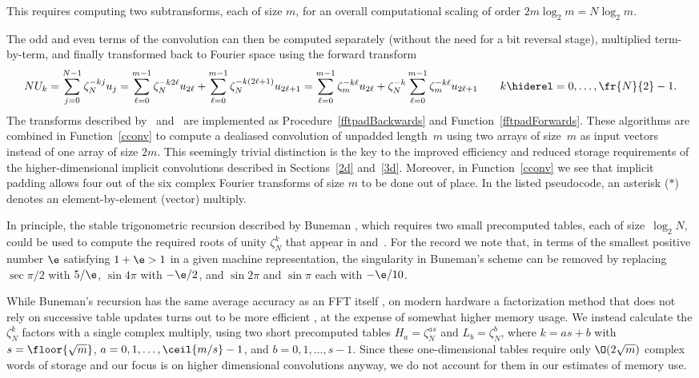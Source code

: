 \documentclass[final]{siamltex}
\def\bel{\begin{dmath}}
\def\eel{\end{dmath}}
\def\no{\hiderel}
\begin{document}
This requires computing two subtransforms, each of size $m$,
for an overall computational scaling of order $2m\log_2 m=N\log_2 m$.

The odd and even terms of the convolution can then be computed separately
(without the need for a bit reversal stage), multiplied term-by-term, and
finally transformed back to Fourier space using the forward transform
\bel
NU_k=\sum_{j=0}^{N-1}\zeta_N^{-kj} u_j
=\sum_{\ell=0}^{m-1}\zeta_N^{-k2\ell} u_{2\ell}
+\sum_{\ell=0}^{m-1}\zeta_N^{-k(2\ell+1)} u_{2\ell+1}
=\sum_{\ell=0}^{m-1}\zeta_m^{-k\ell} u_{2\ell}
+\zeta_N^{-k}\sum_{\ell=0}^{m-1}\zeta_m^{-k\ell} u_{2\ell+1}
\qquad k\no=0,\ldots,\fr{N}{2}-1.\label{cconv1forwards}
\eel
The transforms described by~ and~
are implemented as Procedure~\ref{fftpadBackwards} and
Function~\ref{fftpadForwards}.
These algorithms are combined in Function~\ref{cconv} to 
compute a dealiased convolution of unpadded length~$m$ using
two arrays of size~$m$ as input vectors instead of one array of size $2m$.
This seemingly trivial distinction is the key to the improved efficiency
and reduced storage requirements of the higher-dimensional implicit
convolutions described in Sections~\ref{2d} and~\ref{3d}.
Moreover, in Function~\ref{cconv} we see that implicit padding allows four
out of the six complex Fourier transforms of size $m$ to be done out of place.
In the listed pseudocode, an asterisk ($*$) denotes an element-by-element
(vector) multiply.

In principle, the stable trigonometric recursion described by
Buneman \cite{Buneman87}, which requires two small precomputed tables, each
of size~$\log_2 N$, could be used to compute the required roots of unity
$\zeta_N^k$ that appear in 
and~. For the
record we note that, in terms of the smallest positive number $\e$ 
satisfying $1+\e > 1$ in a given machine representation, the singularity in
Buneman's scheme can be removed by replacing $\sec{\pi/2}$ with  $5/\e$,
$\sin 4\pi$ with $-\e/2$, and $\sin{2\pi}$ and $\sin{\pi}$ each with $-\e/10$.

While Buneman's recursion has the same average accuracy as an FFT
itself \cite{Tasche02}, on modern hardware a factorization method that does
not rely on successive table updates turns out to be more
efficient \cite{Johnson09}, at the expense of somewhat higher memory usage.
We instead calculate the $\zeta_N^k$ factors with a single complex
multiply, using two short precomputed tables $H_a=\zeta_N^{as}$ and
$L_b=\zeta_N^b$, where $k=as+b$ with $s=\floor{\sqrt m}$,
$a=0,1,\ldots,\ceil{m/s}-1$, and $b=0,1,\ldots,s-1$. Since these
one-dimensional tables require only $\O(2\sqrt{m})$ complex words of
storage and our focus is on higher dimensional convolutions anyway, we do
not account for them in our estimates of memory use. 
\end{document}
